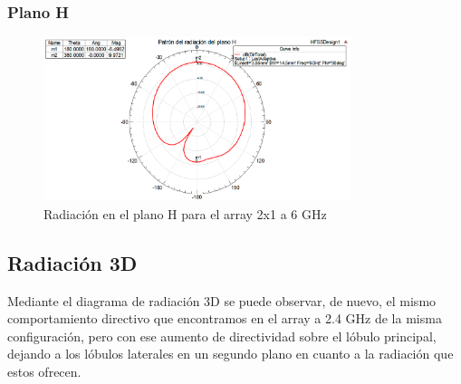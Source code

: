 \subsubsection{Plano H}
\begin{figure}[H]
    \centering
        \includegraphics[width=0.8\textwidth]{archivos/analisis/2x12/5}
        \caption{Radiación en el plano H para el array 2x1 a 6 GHz}
        \label{fig:H2x12}
\end{figure}

\subsection{Radiación 3D}
\par Mediante el diagrama de radiación 3D se puede observar, de nuevo, el mismo comportamiento directivo que encontramos en el array a 2.4 GHz de la misma configuración, pero con ese aumento de directividad sobre el lóbulo principal, dejando a los lóbulos laterales en un segundo plano en cuanto a la radiación que estos ofrecen.

